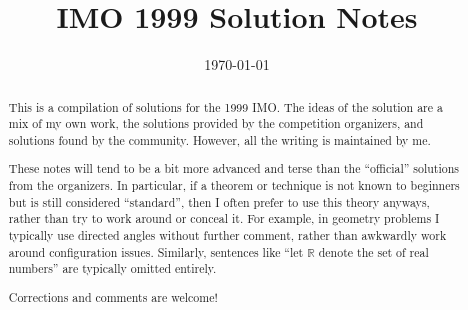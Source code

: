 \documentclass[11pt]{scrartcl}
\title{IMO 1999 Solution Notes}
\date{\today}
\begin{document}
\maketitle

\begin{abstract}
This is a compilation of solutions
for the 1999 IMO.
The ideas of the solution are a mix of my own work,
the solutions provided by the competition organizers,
and solutions found by the community.
However, all the writing is maintained by me.

These notes will tend to be a bit more advanced and terse than the ``official''
solutions from the organizers.
In particular, if a theorem or technique is not known to beginners
but is still considered ``standard'', then I often prefer to
use this theory anyways, rather than try to work around or conceal it.
For example, in geometry problems I typically use directed angles
without further comment, rather than awkwardly work around configuration issues.
Similarly, sentences like ``let $\mathbb{R}$ denote the set of real numbers''
are typically omitted entirely.

Corrections and comments are welcome!
\end{abstract}

\tableofcontents
\newpage

\addtocounter{section}{-1}
\end{document}
